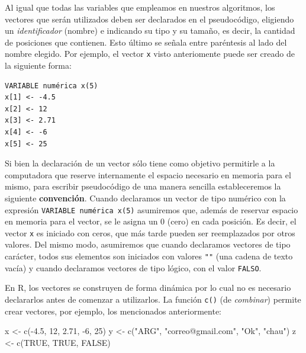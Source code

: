 \documentclass[
]{book}
\newenvironment{Shaded}{\begin{snugshade}}{\end{snugshade}}
\newcommand{\ConstantTok}[1]{\textcolor[rgb]{0.00,0.00,0.00}{#1}}
\newcommand{\DecValTok}[1]{\textcolor[rgb]{0.00,0.00,0.81}{#1}}
\newcommand{\FloatTok}[1]{\textcolor[rgb]{0.00,0.00,0.81}{#1}}
\newcommand{\FunctionTok}[1]{\textcolor[rgb]{0.00,0.00,0.00}{#1}}
\newcommand{\NormalTok}[1]{#1}
\newcommand{\OtherTok}[1]{\textcolor[rgb]{0.56,0.35,0.01}{#1}}
\newcommand{\SpecialCharTok}[1]{\textcolor[rgb]{0.00,0.00,0.00}{#1}}
\newcommand{\StringTok}[1]{\textcolor[rgb]{0.31,0.60,0.02}{#1}}
\begin{document}
Al igual que todas las variables que empleamos en nuestros algoritmos, los vectores que serán utilizados deben ser declarados en el pseudocódigo, eligiendo un \emph{identificador} (nombre) e indicando su tipo y su tamaño, es decir, la cantidad de posiciones que contienen. Esto último se señala entre paréntesis al lado del nombre elegido. Por ejemplo, el vector \texttt{x} visto anteriomente puede ser creado de la siguiente forma:

\begin{verbatim}
VARIABLE numérica x(5)
x[1] <- -4.5
x[2] <- 12
x[3] <- 2.71
x[4] <- -6
x[5] <- 25
\end{verbatim}

Si bien la declaración de un vector sólo tiene como objetivo permitirle a la computadora que reserve internamente el espacio necesario en memoria para el mismo, para escribir pseudocódigo de una manera sencilla estableceremos la siguiente \textbf{convención}. Cuando declaramos un vector de tipo numérico con la expresión \texttt{VARIABLE\ numérica\ x(5)} asumiremos que, además de reservar espacio en memoria para el vector, se le asigna un 0 (cero) en cada posición. Es decir, el vector \texttt{x} es iniciado con ceros, que más tarde pueden ser reemplazados por otros valores. Del mismo modo, asumiremos que cuando declaramos vectores de tipo carácter, todos sus elementos son iniciados con valores \texttt{""} (una cadena de texto vacía) y cuando declaramos vectores de tipo lógico, con el valor \texttt{FALSO}.

En R, los vectores se construyen de forma dinámica por lo cual no es necesario declararlos antes de comenzar a utilizarlos. La función \texttt{c()} (de \emph{combinar}) permite crear vectores, por ejemplo, los mencionados anteriormente:

\begin{Shaded}
\begin{Highlighting}[]
\NormalTok{x }\OtherTok{\textless{}{-}} \FunctionTok{c}\NormalTok{(}\SpecialCharTok{{-}}\FloatTok{4.5}\NormalTok{, }\DecValTok{12}\NormalTok{, }\FloatTok{2.71}\NormalTok{, }\SpecialCharTok{{-}}\DecValTok{6}\NormalTok{, }\DecValTok{25}\NormalTok{)}
\NormalTok{y }\OtherTok{\textless{}{-}} \FunctionTok{c}\NormalTok{(}\StringTok{"ARG"}\NormalTok{, }\StringTok{"correo@gmail.com"}\NormalTok{, }\StringTok{"Ok"}\NormalTok{, }\StringTok{"chau"}\NormalTok{)}
\NormalTok{z }\OtherTok{\textless{}{-}} \FunctionTok{c}\NormalTok{(}\ConstantTok{TRUE}\NormalTok{, }\ConstantTok{TRUE}\NormalTok{, }\ConstantTok{FALSE}\NormalTok{)}
\end{Highlighting}
\end{Shaded}
\end{document}
